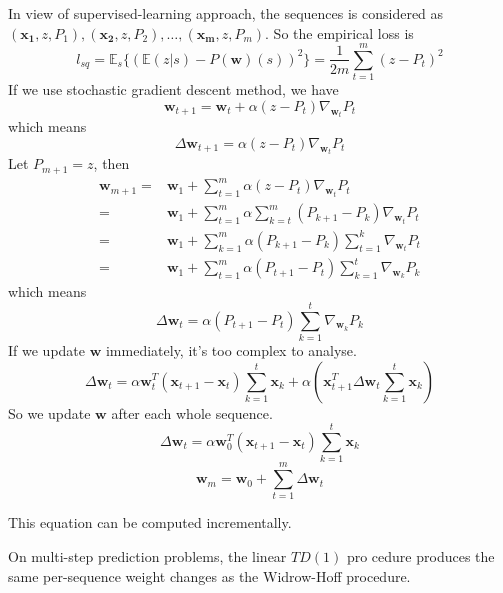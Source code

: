 In view of supervised-learning approach, the sequences is considered as
$ (\mathbf{x_1}, z, P_1), (\mathbf{x_2}, z, P_2), \dots, (\mathbf{x_m}, z, P_m) $.
So the empirical loss is 
\[ 
    l_{sq} = \mathbb{E}_s \{ {( \mathbb{E}(z | s) - P( \mathbf{w})(s))}^2 \} = \frac{1}{2m} \sum\limits^{m}_{t=1} {( z - P_t )}^2
\]
If we use stochastic gradient descent method, we have
\[ 
	\mathbf{w}_{t+1} = \mathbf{w}_{t} + \alpha (z - P_t)\nabla_{\mathbf{w}_{t}} P_t
\]
which means
\begin{equation}
	\Delta \mathbf{w}_{t+1} = \alpha(z - P_{t}) \nabla_{\mathbf{w}_{t}} P_t
\end{equation}
Let $ P_{m+1} = z $, then
\begin{align*}
    \mathbf{w}_{m+1} =& \mathbf{w}_{1} + \sum\limits^{m}_{t=1} \alpha(z - P_t) \nabla_{\mathbf{w}_{t}} P_t\\
	=& \mathbf{w}_{1} + \sum\limits^{m}_{t=1} \alpha
    \sum\limits^{m}_{k=t}(P_{k+1} - P_k) \nabla_{\mathbf{w}_{t}} P_t \\
    =& \mathbf{w}_{1} + \sum\limits^{m}_{k=1} \alpha (P_{k+1} - P_k) 
	\sum\limits^{k}_{t=1}\nabla_{\mathbf{w}_{t}} P_t\\
    =& \mathbf{w}_{1} + \sum\limits^{m}_{t=1} \alpha (P_{t+1} - P_t) 
	\sum\limits^{t}_{k=1}\nabla_{\mathbf{w}_{k}} P_k
\end{align*}
which means
\begin{equation}
    \Delta \mathbf{w}_{t} = \alpha (P_{t+1} - P_t) \sum\limits^{t}_{k=1}\nabla_{\mathbf{w}_{k}} P_k
\end{equation}
If we update $ \mathbf{w} $ immediately, it's too complex to analyse.
\[
    \Delta \mathbf{w}_{t} = \alpha \mathbf{w}_{t}^T ( \mathbf{x}_{t+1} - \mathbf{x} _{t}) \sum^{t}_{k=1} \mathbf{x}_k
    + \alpha( \mathbf{x}^T_{t+1} \Delta\mathbf{w}_{t} \sum^{t}_{k=1} \mathbf{x}_k )
\]
So we update $ \mathbf{w} $ after each whole sequence.
\[
    \Delta \mathbf{w}_{t} = \alpha \mathbf{w}_{0}^T ( \mathbf{x}_{t+1} - \mathbf{x} _{t}) \sum^{t}_{k=1} \mathbf{x}_k
\]
\[
    \mathbf{w}_m = \mathbf{w}_0 + \sum^{m}_{t=1} \Delta\mathbf{w}_t
\]

This equation can be computed incrementally.

\begin{thm}
	On multi-step prediction problems, the linear $TD(1)$ pro cedure produces
	the same per-sequence weight changes as the Widrow-Hoff procedure.
\end{thm}

